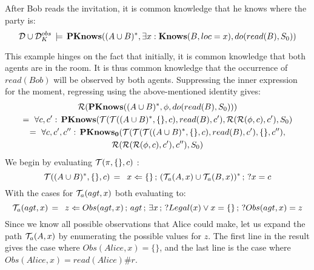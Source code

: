 \begin{example}
After Bob reads the invitation, it is common knowledge that he knows
where the party is:\[
\mathcal{D}\cup\mathcal{D}_{K}^{obs}\,\models\,\mathbf{PKnows}((A\cup B)^{*},\exists x:\mathbf{Knows}(B,loc=x),do(read(B),S_{0}))\]

\end{example}
This example hinges on the fact that initially, it is common knowledge
that both agents are in the room. It is thus common knowledge that
the occurrence of $read(Bob)$ will be observed by both agents. Suppressing
the inner expression for the moment, regressing using the above-mentioned
identity gives:\begin{multline*}
\mathcal{R}(\mathbf{PKnows}((A\cup B)^{*},\phi,do(read(B),S_{0})))\\
=\,\,\forall c,c':\,\mathbf{PKnows}(\mathcal{T}(\mathcal{T}((A\cup B)^{*},\{\},c),read(B),c'),\mathcal{R}(\mathcal{R}(\phi,c),c'),S_{0})\\
=\,\,\forall c,c',c'':\,\mathbf{PKnows_{0}}(\mathcal{T}(\mathcal{T}(\mathcal{T}((A\cup B)^{*},\{\},c),read(B),c'),\{\},c''),\\
\mathcal{R}(\mathcal{R}(\mathcal{R}(\phi,c),c'),c''),S_{0})\end{multline*}
 We begin by evaluating $\mathcal{T}(\pi,\{\},c)$ :\[
\mathcal{T}((A\cup B)^{*},\{\},c)\,=\,\,\, x\Leftarrow\{\}\,;\,(\mathcal{T}_{a}(A,x)\cup\mathcal{T}_{a}(B,x))^{*}\,;\,?x=c\]
 With the cases for $\mathcal{T}_{a}(agt,x)$ both evaluating to:\[
\mathcal{T}_{a}(agt,x)\,=\,\,\, z\Leftarrow Obs(agt,x)\,;\, agt\,;\,\exists x\,;\,?Legal(x)\vee x=\{\}\,;\,?Obs(agt,x)=z\]
 Since we know all possible observations that Alice could make, let
us expand the path $\mathcal{T}_{a}(A,x)$ by enumerating the possible values
for $z$. The first line in the result gives the case where $Obs(Alice,x)=\{\}$,
and the last line is the case where $Obs(Alice,x)=read(Alice)\#r$.
